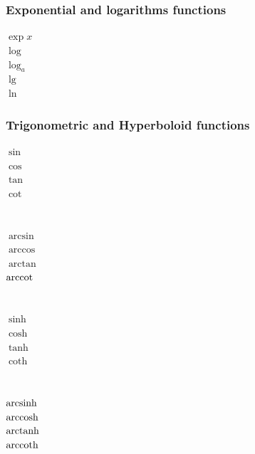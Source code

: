 \subsubsection{Exponential and logarithms functions}
\begin{tabbing}
\mySymbols
 $\exp x $             \>                     \> \verb`   `  \\
 $\log $               \>                     \> \verb`   `  \\
 $\log_a $             \>                     \> \verb`   `  \\
 $\lg $                \>                     \> \verb`   `  \\
 $\ln $                \>                     \> \verb`   `  \\
\end{tabbing}

\subsubsection{Trigonometric and Hyperboloid functions}
\begin{tabbing}
\mySymbols
 $\sin$                \>                     \> \verb`   `  \\
 $\cos $               \>                     \> \verb`   `  \\
 $\tan $               \>                     \> \verb`   `  \\
 $\cot $               \>                     \> \verb`   `  \\
\\
\\
 $\arcsin $            \>                     \> \verb`   `  \\
 $\arccos $            \>                     \> \verb`   `  \\
 $\arctan $            \>                     \> \verb`   `  \\
 $\mathrm{arccot} $            \>                     \> \verb`   `  \\
\\ 
\\
 $\sinh $              \>                     \> \verb`   `  \\
 $\cosh $              \>                     \> \verb`   `  \\
 $\tanh $              \>                     \> \verb`   `  \\
 $\coth $              \>                     \> \verb`   `  \\
\\
\\
 $\mathrm{arcsinh} $           \>                     \> \verb`   `  \\
 $\mathrm{arccosh} $           \>                     \> \verb`   `  \\
 $\mathrm{arctanh} $           \>                     \> \verb`   `  \\
 $\mathrm{arccoth} $           \>                     \> \verb`   `  \\
\end{tabbing}

